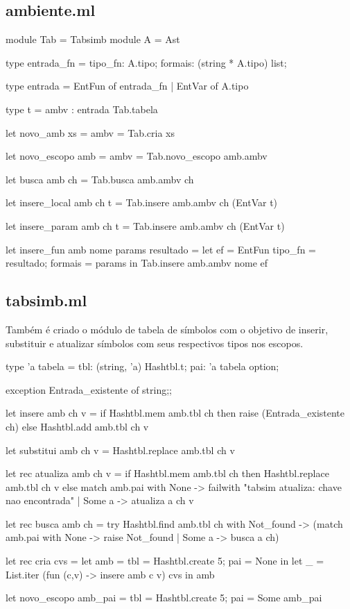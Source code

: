 \documentclass[12pt,a4paper,twoside]{report}
\begin{document}
\subsection{ambiente.ml}
\begin{terminal}
module Tab = Tabsimb
module A = Ast

type entrada_fn = { tipo_fn:  A.tipo;
                    formais: (string * A.tipo) list;
}

type entrada =  EntFun of entrada_fn
             |  EntVar of A.tipo

type t = {
  ambv : entrada Tab.tabela
}

let novo_amb xs = { ambv = Tab.cria xs }

let novo_escopo amb = { ambv = Tab.novo_escopo amb.ambv }

let busca amb ch = Tab.busca amb.ambv ch

let insere_local amb ch t =
  Tab.insere amb.ambv ch (EntVar t)

let insere_param amb ch t =
  Tab.insere amb.ambv ch (EntVar t)

let insere_fun amb nome params resultado =
  let ef = EntFun { tipo_fn = resultado;
                    formais = params }
  in Tab.insere amb.ambv nome ef

\end{terminal}

\subsection{tabsimb.ml}
Também é criado o módulo de tabela de símbolos com o objetivo de inserir, substituir e atualizar símbolos com seus respectivos tipos nos escopos.
\begin{terminal}

type 'a tabela = {
    tbl: (string, 'a) Hashtbl.t;
    pai: 'a tabela option;
}

exception Entrada_existente of string;;

let insere amb ch v =
  if Hashtbl.mem amb.tbl ch
  then raise (Entrada_existente ch)
  else Hashtbl.add amb.tbl ch v

let substitui amb ch v = Hashtbl.replace amb.tbl ch v

let rec atualiza amb ch v =
    if Hashtbl.mem amb.tbl ch
    then Hashtbl.replace amb.tbl ch v
    else match amb.pai with
       None -> failwith "tabsim atualiza: chave nao encontrada"
     | Some a -> atualiza a ch v

let rec busca amb ch =
  try Hashtbl.find amb.tbl ch
  with Not_found ->
    (match amb.pai with
       None -> raise Not_found
     | Some a -> busca a ch)

let rec cria cvs =
  let amb = {
    tbl = Hashtbl.create 5;
    pai = None
  } in
  let _ = List.iter (fun (c,v) -> insere amb c v) cvs
  in amb

let novo_escopo amb_pai = {
  tbl = Hashtbl.create 5;
  pai = Some amb_pai
}
\end{terminal}
\end{document}
